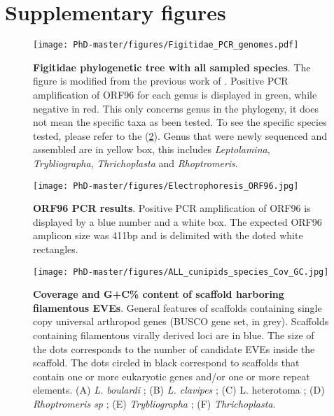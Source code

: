 \section{Supplementary figures}


\begin{figure}[!htpbt]
\texttt{[image: PhD-master/figures/Figitidae\_PCR\_genomes.pdf]}\centering
\caption[Paper3:Figitidae phylogenetic tree with all sampled species]{\textbf{Figitidae phylogenetic tree with all sampled species}. The figure is modified from the previous work of \cite{blaimer_comprehensive_2020}. Positive PCR amplification of ORF96 for each genus is displayed in green, while negative in red. This only concerns genus in the phylogeny, it does not mean the specific taxa as been tested. To see the specific species tested, please refer to the (\figurename{\ref{figure:Electrophoresis_ORF96}}). Genus that were newly sequenced and assembled are in yellow box, this includes \textit{Leptolamina}, \textit{Trybliographa}, \textit{Thrichoplasta} and \textit{Rhoptromeris}.}
\label{figure:Figitidae_diversity}
\end{figure}


\begin{figure}[!htpbt]
\texttt{[image: PhD-master/figures/Electrophoresis\_ORF96.jpg]}\centering
\caption[Paper3:ORF96 PCR results on Figitidae species]{\textbf{ORF96 PCR results}. Positive PCR amplification of ORF96 is displayed by a blue number and a white box. The expected ORF96 amplicon size was 411bp and is delimited with the doted white rectangles.}
\label{figure:Electrophoresis_ORF96}
\end{figure}


\begin{figure}[!htpbt]
\texttt{[image: PhD-master/figures/ALL\_cunipids\_species\_Cov\_GC.jpg]}\centering
\caption[Paper3:Eucoilini COV/GC scaffold ditributions]{\textbf{Coverage and G+C\% content of scaffold harboring filamentous EVEs}.  General features of scaffolds containing single copy universal arthropod genes (BUSCO gene set, in grey). Scaffolds containing filamentous virally derived loci are in blue. The size of the dots corresponds to the number of candidate EVEs inside the scaffold. The dots circled in black correspond to scaffolds that contain one or more eukaryotic genes and/or one or more repeat elements. (A) \textit{L. boulardi} ;  (B) \textit{L. clavipes} ; (C) L. heterotoma ; (D) \textit{Rhoptromeris sp} ; (E) \textit{Trybliographa} ; (F) \textit{Thrichoplasta}.}
\label{figure:ALL_cunipids_species_Cov_GC}
\end{figure}

